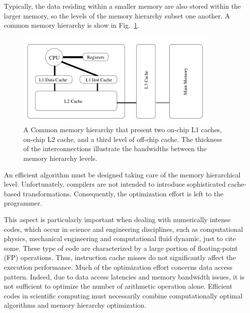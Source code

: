 Typically, the data residing within a smaller memory are also stored within the larger memory, so the levels of the memory hierarchy subset one another. A common memory hierarchy is show in Fig.~\ref{fig:memory-hierarchy}.
\begin{figure}
   \centering
   \includegraphics[width=10cm]{Figs/Memory_hierarchy.png}
   \caption{A Common memory hierarchy that present two on-chip L1 caches, on-chip L2 cache, and a third level of off-chip cache. The thickness of the interconnections illustrate the bandwidths between the memory hierarchy levels.} \label{fig:memory-hierarchy}
\end{figure} 

An efficient algorithm must be designed taking care of the memory hierarchical level. Unfortunately, compilers are not intended to introduce sophisticated cache-based transformations. Consequently, the optimization effort is left to the programmer. 

This aspect is particularly important when dealing with numerically intense codes, which occur in science and engineering disciplines, such as computational physics, mechanical engineering and computational fluid dynamic, just to cite some. These type of code are characterized by a large portion of floating-point (FP) operations. Thus, instruction cache misses do not significantly affect the execution performance. Much of the optimization effort concerns data access pattern. Indeed, due to data access latencies and memory bandwidth issues, it is not sufficient to optimize the number of arithmetic operation alone. Efficient codes in scientific computing must necessarily combine computationally optimal algorithms and memory hierarchy optimization.

